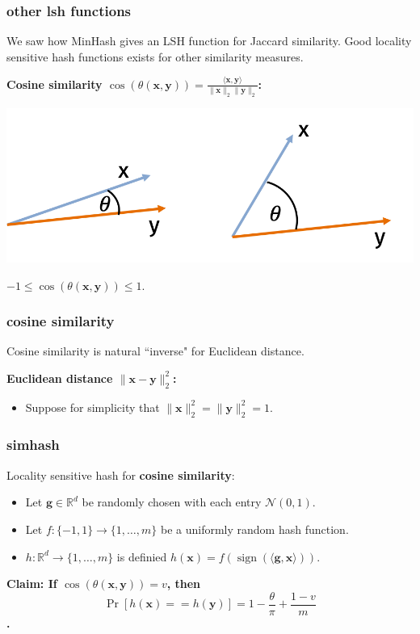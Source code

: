 \documentclass[compress]{beamer}
\newcommand{\bv}[1]{\mathbf{#1}}
\newcommand{\R}{\mathbb{R}}
\DeclareMathOperator{\sign}{sign}
\begin{document}
\begin{frame}
	\frametitle{other lsh functions}
	\begin{center}
		We saw how MinHash gives an LSH function for Jaccard similarity. Good locality sensitive hash functions exists for other similarity measures.
	\end{center}
	\textbf{Cosine similarity $\cos\left(\theta(\bv{x},\bv{y})\right) = \frac{\langle \bv{x},\bv{y}\rangle}{\|\bv{x}\|_2\|\bv{y}\|_2}$:}
	\begin{center}
		\includegraphics[width=.7\textwidth]{cos_sim.png}
		
		$-1 \leq \cos\left(\theta(\bv{x},\bv{y})\right) \leq 1$.
	\end{center}
\end{frame}

\begin{frame}
	\frametitle{cosine similarity}
	\begin{center}
		Cosine similarity is natural ``inverse" for Euclidean distance.
	\end{center}
		\textbf{Euclidean distance $\|\bv{x} - \bv{y}\|_2^2$:}
		\begin{itemize}
			\item Suppose for simplicity that $\|\bv{x}\|_2^2 = \|\bv{y}\|_2^2 = 1$.
		\end{itemize}
\end{frame}

\begin{frame}
	\frametitle{simhash}
	Locality sensitive hash for \textbf{cosine similarity}:
	\begin{itemize}
		\item Let $\bv{g} \in \R^d$ be randomly chosen with each entry $\mathcal{N}(0,1)$. 
		\item Let $f: \{-1,1\} \rightarrow \{1,\ldots, m\}$ be a uniformly random hash function. 
		\item $h: \R^d \rightarrow \{1,\ldots, m\}$ is definied $h(\bv{x}) = f\left(\sign(\langle \bv{g}, \bv{x} \rangle)\right)$.
	\end{itemize}
	\begin{center}
		\alert{\textbf{
				\large
				Claim: If $\cos(\theta(\bv{x},\bv{y})) = v$, then $$\Pr[h(\bv{x}) == h(\bv{y})] = 1 - \frac{\theta}{\pi}  + \frac{1-v}{m}$$.
		}}
	\end{center}
\end{frame}
\end{document}
